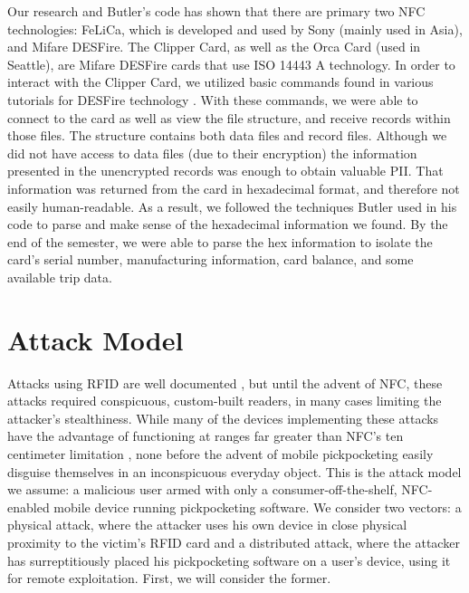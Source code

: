 \documentclass{IEEEtran}
\begin{document}
Our research and Butler's code has shown that there are primary two NFC technologies: FeLiCa, which is developed and used by Sony (mainly used in Asia), and Mifare DESFire. The Clipper Card, as well as the Orca Card (used in Seattle), are Mifare DESFire cards that use ISO 14443 A technology.  In order to interact with the Clipper Card, we utilized basic commands found in various tutorials for DESFire technology \cite{public-transport-card-exploits}.  With these commands, we were able to connect to the card as well as view the file structure, and receive records within those files.  The structure contains both data files and record files.  Although we did not have access to data files (due to their encryption) the information presented in the unencrypted records was enough to obtain valuable PII.  That information was returned from the card in hexadecimal format, and therefore not easily human-readable.  As a result, we followed the techniques Butler used in his code to parse and make sense of the hexadecimal information we found.  By the end of the semester, we were able to parse the hex information to isolate the card's serial number, manufacturing information, card balance, and some available trip data.

\section{Attack Model}
Attacks using RFID are well documented \cite{picking-virtual-pockets} \cite{eavesdropping-attacks-hfrfid-tokens}, but until the advent of NFC, these attacks required conspicuous, custom-built readers, in many cases limiting the attacker's stealthiness.  While many of the devices implementing these attacks have the advantage of functioning at ranges far greater than NFC's ten centimeter limitation \cite{Kirschenbaum06howto}, none before the advent of mobile pickpocketing easily disguise themselves in an inconspicuous everyday object.  This is the attack model we assume:  a malicious user armed with only a consumer-off-the-shelf, NFC-enabled mobile device running pickpocketing software.  We consider two vectors:  a physical attack, where the attacker uses his own device in close physical proximity to the victim's RFID card and a distributed attack, where the attacker has surreptitiously placed his pickpocketing software on a user's device, using it for remote exploitation.  First, we will consider the former.  
\end{document}
